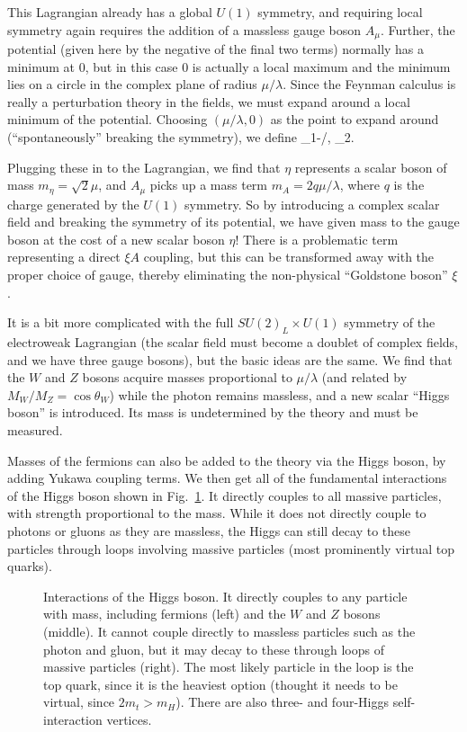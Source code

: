 This  Lagrangian already has a global $U(1)$ symmetry, and requiring local symmetry again requires the addition
of a massless gauge boson $A_\mu$.
Further, the potential (given here by the negative of the final two terms) normally has a minimum at 0, but in this case 0 is
actually a local maximum and the minimum lies on a circle in the complex plane of radius $\mu/\lambda$.
Since the Feynman calculus is really a perturbation theory in the fields, we must expand around a local minimum of the
potential. Choosing $(\mu/\lambda,0)$ as the point to expand around (``spontaneously'' breaking the symmetry), we define
\be
\eta\equiv\phi_1-\mu/\lambda, \;\;\; \xi\equiv\phi_2.
\ee

Plugging these in to the Lagrangian, we find that $\eta$ represents a scalar boson of mass $m_\eta=\sqrt{2}\mu$,
and $A_\mu$ picks up a mass term $m_A=2q\mu/\lambda$, where $q$ is the charge generated by the $U(1)$
symmetry. So by introducing a complex scalar field and breaking the symmetry of its potential, we have given
mass to the gauge boson at the cost of a new scalar boson $\eta$! There is a problematic term representing
a direct $\xi A$ coupling, but this can be transformed away with the proper choice of gauge, thereby eliminating 
the non-physical ``Goldstone boson'' $\xi$.

It is a bit more complicated with the full $SU(2)_L\times U(1)$ symmetry of the electroweak Lagrangian (the scalar
field must become a doublet of complex fields, and we have three gauge bosons), but the basic ideas are the same.
We find that the $W$ and $Z$ bosons acquire masses proportional to $\mu/\lambda$ (and related by $M_W/M_Z=\cos\theta_W$)
while the photon remains massless, and a new scalar ``Higgs boson'' is introduced. Its mass is undetermined by the theory
and must be measured.

Masses of the fermions can also be added to the theory via the Higgs boson, by adding Yukawa coupling terms. We then get all of the fundamental
interactions of the Higgs boson shown in Fig.~\ref{fig:higgs_diagrams}. It directly couples to all massive particles,
with strength proportional to the mass. While it does not directly couple to photons or gluons as they are massless,
the Higgs can still decay to these particles through loops involving massive particles (most prominently
virtual top quarks).

\begin{figure}[t]
  \addtolength{\abovecaptionskip}{5mm}
  \centering
  \vskip5mm
  
  
  
    \caption{Interactions of the Higgs boson. It directly couples to any particle with mass,
      including fermions (left) and the $W$ and $Z$ bosons (middle). It cannot couple directly
      to massless particles such as the photon and gluon, but it may decay to these through loops
      of massive particles (right). The most likely particle in the loop is the top quark, since
      it is the heaviest option (thought it needs to be virtual, since $2m_t > m_H$). There
      are also three- and four-Higgs self-interaction vertices.
            }
    \label{fig:higgs_diagrams}
\end{figure}

